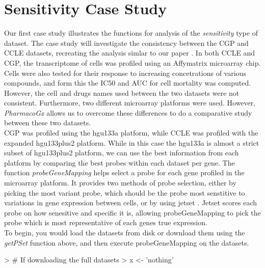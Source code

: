 \documentclass[11pt]{article}
\begin{document}
\section{Sensitivity Case Study}

Our first case study illustrates the functions for analysis of the \textit{sensitivity} type of dataset. The case study will investigate the consistency between the CGP and CCLE datasets, recreating the analysis simlar to our paper \cite{HaibeKains:2013ie}. In both CCLE and CGP, the transcriptome of cells was profiled using an Affymatrix microarray chip. Cells were also tested for their response to increasing concetrations of various compounds, and form this the IC50 and AUC for cell mortality was computed. However, the cell and drugs names used between the two datasets were not consistent. Furthermore, two different microarray platforms were used. However, \textit{PharmacoGx} allows us to overcome these differences to do a comparative study between these two datasets. \\


CGP was profiled using the hgu133a platform, while CCLE was profiled with the expanded hgu133plus2 platform. While in this case the hgu133a is almost a strict subset of hgu133plus2 platform, we can use the best information from each platform by comparing the best probes within each dataset per gene. The function \textit{probeGeneMapping} helps select a probe for each gene profiled in the microarray platform. It provides two methods of probe selection, either by picking the most variant probe, which should be the probe most senstitive to variations in gene expression between cells, or by using jetset \cite{Li:2011cc}. Jetset scores each probe on how senesitive and specific it is, allowing probeGeneMapping to pick the probe which is most representative of each genes true expression. \\

To begin, you would load the datasets from disk or download them using the \textit{getPSet} function above, and then execute probeGeneMapping on the datasets. 
\begin{Schunk}
\begin{Sinput}
>   # If downloading the full datasets
> x <- 'nothing'
\end{Sinput}
\end{Schunk}
\end{document}
